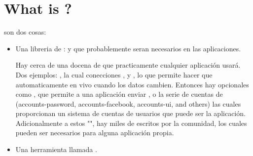 \section{What is \meteor?}

\meteor son dos cosas:
\begin{itemize}
	\item  Una libreria de \packages: \modules \prewritten y \selfcontained que probablemente seran necesarios en las aplicaciones.

Hay cerca de una docena de \packages \core \meteor que practicamente cualquier aplicación usará.  Dos ejemplos: \webapp, la cual \handle \incomming conecciones \http, y \templating, lo que permite hacer \templates \html que automaticamente \update en vivo cuando los datos cambien. Entonces hay \packages opcionales como \email, que permite a una aplicación enviar \emails, o la serie de cuentas de \meteor (accounts-password, accounts-facebook, accounts-ui, and others) las cuales proporcionan un sistema de cuentas de usuarios \fullfeatured que puede ser \droprightinto la aplicación. Adicionalmente a estos \packages "\core", hay miles de \packages escritos por la comunidad, los cuales pueden ser necesarios para alguna aplicación propia.

\item Una herramienta \commandline llamada \commandlinemeteor.


\end{itemize}
